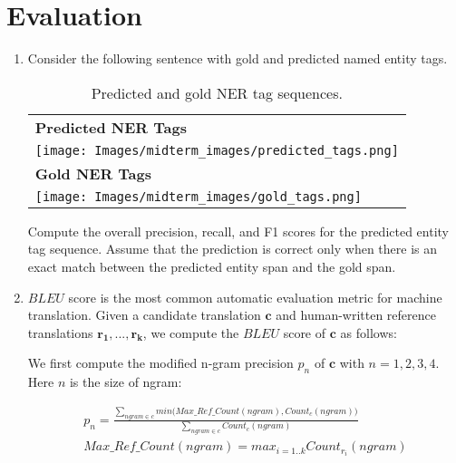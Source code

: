 \documentclass[12pt, letterpaper]{article}
\begin{document}
\section{Evaluation}

\begin{enumerate}

    \item Consider the following sentence with gold and predicted named entity tags.
    
    
    \begin{table}[h!]
    \begin{center}
    \small
    \begin{tabular}{l} 
    \hline
    \textbf{Predicted NER Tags} \\
    \texttt{[image: Images/midterm\_images/predicted\_tags.png]}
    \\
    \hline
    \textbf{Gold NER Tags} \\
    \texttt{[image: Images/midterm\_images/gold\_tags.png]}
    \\
    \hline
    \end{tabular}
    \caption{Predicted and gold NER tag sequences.}
    \end{center}
    \end{table}

    
  Compute the overall precision, recall, and F1 scores for the predicted entity tag sequence. Assume that the prediction is correct only when there is an exact match between the predicted entity span and the gold span. 
    
    \item 
    
    $BLEU$ score is the most common automatic evaluation metric for machine translation. Given a candidate translation $\mathbf{c}$ and human-written reference translations $\mathbf{r_1}, . . . , \mathbf{r_k}$, we compute the $BLEU$ score of $\mathbf{c}$ as follows:
    
    We first compute the modified n-gram precision $p_n$ of $\mathbf{c}$ with $n = 1,2,3,4$. Here $n$ is the size of ngram:
    
    \begin{align*}
        p_n = \frac{\sum_{ngram \in c} min \Big( Max\_Ref\_Count(ngram), Count_{c}(ngram) \Big) }{\sum_{ngram \in c} Count_{c}(ngram)} \\
        Max\_Ref\_Count(ngram) = max_{i=1..k} Count_{r_i}(ngram) 
    \end{align*}
    

\end{enumerate}
\end{document}
